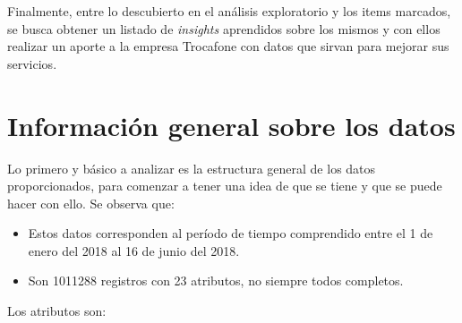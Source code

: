 \documentclass[a4paper]{article}
\begin{document}
Finalmente, entre lo descubierto en el análisis exploratorio y los items marcados, se busca obtener un listado de \textit{insights} aprendidos sobre los mismos y con ellos realizar un aporte a la empresa Trocafone con datos que sirvan para mejorar sus servicios. 

\section{Información general sobre los datos}

Lo primero y básico a analizar es la estructura general de los datos proporcionados, para comenzar a tener una idea de que se tiene y que se puede hacer con ello. Se observa que:

\begin{itemize}
\item Estos datos corresponden al período de tiempo comprendido entre el 1 de enero del 2018 al 16 de junio del 2018.
\item Son 1011288 registros con 23 atributos, no siempre todos completos.
\end{itemize}

Los atributos son:
\end{document}
